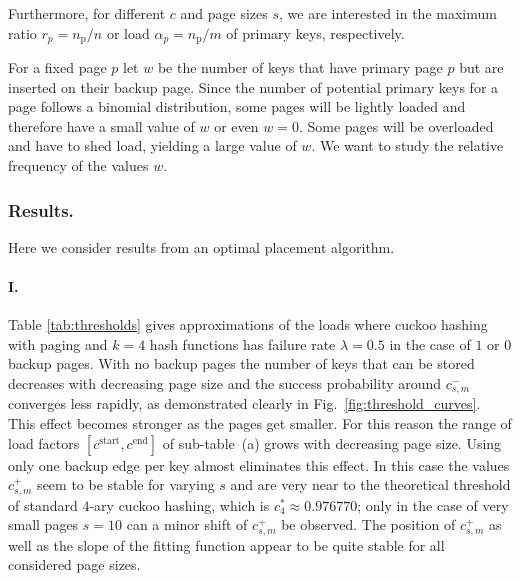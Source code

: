 \let\accentvec\vec \documentclass{llncs}
\newcommand{\nprim}{{n_{\mathrm{p}}}}
\newcommand{\fr}{\lambda}
\newcommand{\npn}{r_p}
\newcommand{\npm}{\alpha_p}
\newcommand{\wb}{w}
\newcommand{\tnb}{{c^{\scriptscriptstyle-}_{s,m}}}
\newcommand{\tb}{{c^{\scriptscriptstyle+}_{s,m}}}
\newcommand{\cs}{c^{\scriptstyle\mathrm{start}}}
\newcommand{\ce}{c^{\scriptstyle\mathrm{end}}}
\begin{document}
Furthermore, for different $c$ and page sizes $s$, we are interested in the maximum ratio $\npn=\nprim/n$ or load $\npm=\nprim/m$ of primary keys, respectively.

For a fixed page $p$ let $\wb$ be the number of keys that have primary page $p$ but are inserted on their backup page.
Since the number of potential primary keys for a page follows a binomial distribution, 
some pages will be lightly loaded and therefore have a small value of $\wb$ or even $\wb=0$.
Some pages will be overloaded and have to shed load, yielding a large value of $\wb$.
We want to study the relative frequency of the values $\wb$.

\subsubsection{Results.}  Here we consider results from an optimal placement algorithm.


\paragraph{I.}Table \ref{tab:thresholds} gives approximations of the loads where cuckoo hashing with paging and $k=4$ hash functions has failure rate $\fr=0.5$ in the case of $1$ or $0$ backup pages. With no backup pages the number of keys that can be stored decreases with decreasing page size and the success probability around $\tnb$ converges less rapidly, as demonstrated clearly in Fig.~\ref{fig:threshold_curves}. This effect becomes stronger as the pages get smaller. For this reason the range of load factors $[\cs,\ce]$ of sub-table~(a) grows with decreasing page size. Using only one backup edge per key almost eliminates this effect.
In this case the values $\tb$ seem to be stable for varying $s$ and are very near to the theoretical threshold of standard $4$-ary cuckoo hashing, which is $c^*_4\approx0.976770$; only in the case of very small pages $s=10$ can a minor shift of $\tb$ be observed. 
The position of $\tb$ as well as the slope of the fitting function appear to be quite stable for all considered page sizes. 
\end{document}
